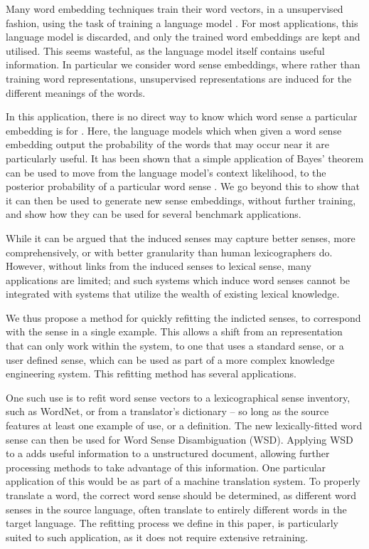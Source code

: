 \documentclass{sig-alternate}
\begin{document}
Many word embedding techniques train their word vectors, in a unsupervised fashion, using the task of training a language model \parencite{NPLM, collobert2008unified, mikolov2013efficient}.
For most applications, this language model is discarded, and only the trained word embeddings are kept and utilised.
This seems wasteful, as the language model itself contains useful information. In particular we consider word sense embeddings, where rather than training word representations, unsupervised representations are induced for the different meanings of the words.

In this application, there is no direct way to know which word sense a particular embedding is for \parencite{Reisinger2010,Huang2012,tian2014probabilistic, AdaGrams}.
Here, the language models which when given a word sense embedding output the probability of the words that may occur near it are particularly useful. It has been shown that a simple application of Bayes' theorem can be used to move from the language model's context likelihood, to the posterior probability of a particular word sense \cite{tian2014probabilistic,AdaGrams}. We go beyond this to show that it can then be used to generate new sense embeddings, without further training, and show how they can be used for several benchmark applications.


While it can be argued that the induced senses may capture better senses, more comprehensively, or with better granularity than human lexicographers do.
However, without links from the induced senses to lexical sense, many applications are limited; and such systems which induce word senses cannot be integrated with systems that utilize the wealth of existing lexical knowledge.

We thus propose a method for quickly refitting the indicted senses, to correspond with the sense in a single example. This allows a shift from an representation that can only work within the system, to one that uses a standard sense, or a user defined sense, which can be used as part of a more complex knowledge engineering system. This refitting method  has several applications.


One such use is to refit word sense vectors to a lexicographical sense inventory, such as WordNet, or from a translator's dictionary -- so long as the source features at least one example of use, or a definition. The new lexically-fitted word sense can then be used for Word Sense Disambiguation (WSD). Applying WSD to a adds useful information to a unstructured document, allowing further processing methods to take advantage of this information. One particular application of this would be as part of a machine translation system. To properly translate a word, the correct word sense should be determined, as different word senses in the source language, often translate to entirely different words in the target language. The refitting process we define in this paper, is particularly suited to such application, as it does not require extensive retraining.
\end{document}

